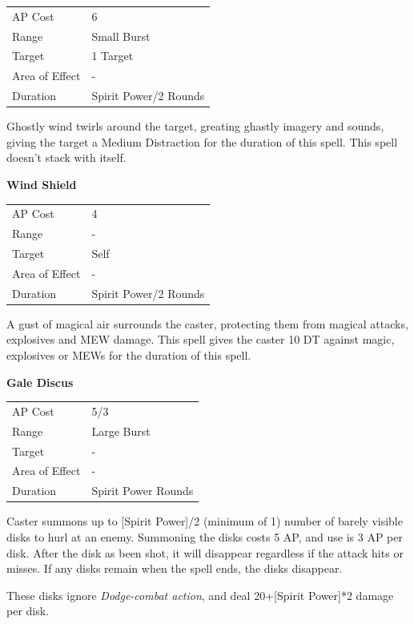\documentclass[11pt,a4paper,twocolumn]{book}
\begin{document}
\smallskip
{
	\begin{tabu} to 70mm{| X[l,4] | X[l,7] |}
		\hline
        AP Cost	      	& 6 						\\
        Range     		& Small Burst				\\
        Target      	& 1 Target					\\
        Area of Effect  & -  	 					\\
        Duration     	& Spirit Power/2 Rounds		\\ \hline
	\end{tabu}
		
}
\smallskip

Ghostly wind twirls around the target, greating ghastly imagery and sounds, giving the target a Medium Distraction for the duration of this spell. This spell doesn't stack with itself.

\bigskip
\noindent
\textbf{Wind Shield}

\smallskip
{
	\begin{tabu} to 70mm{| X[l,4] | X[l,7] |}
		\hline
        AP Cost	      	& 4 						\\
        Range     		& -							\\
        Target      	& Self						\\
        Area of Effect  & -  	 					\\
        Duration     	& Spirit Power/2 Rounds		\\ \hline
	\end{tabu}
		
}
\smallskip

A gust of magical air surrounds the caster, protecting them from magical attacks, explosives and MEW damage. This spell gives the caster 10 DT against magic, explosives or MEWs for the duration of this spell.

\bigskip
\noindent
\textbf{Gale Discus}

\smallskip
{
	\begin{tabu} to 70mm{| X[l,4] | X[l,7] |}
		\hline
        AP Cost	      	& 5/3 						\\
        Range     		& Large Burst				\\
        Target      	& -							\\
        Area of Effect  & -  	 					\\
        Duration     	& Spirit Power Rounds		\\ \hline
	\end{tabu}
		
}
\smallskip

Caster summons up to [Spirit Power]/2 (minimum of 1) number of barely visible disks to hurl at an enemy. Summoning the disks costs 5 AP, and use is 3 AP per disk. After the disk as been shot, it will disappear regardless if the attack hits or misses. If any disks remain when the spell ends, the disks disappear. 

These disks ignore \textit{Dodge-combat action}, and deal 20+[Spirit Power]*2 damage per disk.

\bigskip

	


    
    
\end{document}
